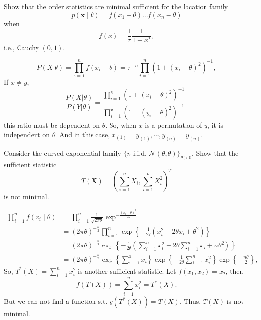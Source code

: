 \begin{exercise}
    Show that the order statistics are minimal sufficient for the location family
    \[
        p(\mathbf{x} \mid \theta)=f\left(x_{1}-\theta\right) \ldots f\left(x_{n}-\theta\right)
    \]
    when
    \[
        f(x)=\frac{1}{\pi} \frac{1}{1+x^{2}},
    \]
    i.e., Cauchy \((0,1)\). 
\end{exercise}

\begin{solution}
    \[
        P(X|\theta)=\prod_{i=1}^nf(x_i-\theta)=\pi^{-n}\prod_{i=1}^n(1+(x_i-\theta)^2)^{-1}, 
    \]
    If $x\neq y$, 
    \[
        \frac{P(X|\theta)}{P(Y|\theta)}=\frac{\prod_{i=1}^n(1+(x_i-\theta)^2)^{-1}}{\prod_{i=1}^n(1+(y_i-\theta)^2)^{-1}}, 
    \]
    this ratio must be dependent on $\theta$. So, when $x$ is a permutation of $y$, it is independent on $\theta$. And in this case, $x_{(1)}=y_{(1)}, \cdots, y_{(n)}=y_{(n)}$. 
\end{solution}

\begin{exercise}
    Consider the curved exponential family \(\{n \text { i.i.d. } \mathcal{N}(\theta, \theta)\}_{\theta>0}\). Show that the sufficient statistic
    \[
        T(\mathbf{X})=\left(\sum_{i=1}^{n} X_{i}, \sum_{i=1}^{n} X_{i}^{2}\right)^T
    \]
    is not minimal. 
\end{exercise}

\begin{solution}
    \[
        \begin{aligned} 
            \prod_{i=1}^{n} f\left(x_{i} \mid \theta\right) &=\prod_{i=1}^{n} \frac{1}{\sqrt{2 \pi \theta}} \exp^{-\frac{\left(x_{i}-\theta\right)^{2}}{2 \theta}} \\ &=(2 \pi \theta)^{-\frac{n}{2}} \prod_{i=1}^{n} \exp \left\{-\frac{1}{2 \theta}\left(x_{i}^{2}-2 \theta x_{i}+\theta^{2}\right)\right\} \\ &=(2 \pi \theta)^{-\frac{n}{2}} \exp \left\{-\frac{1}{2 \theta}\left(\sum_{i=1}^{n} x_{i}^{2}-2 \theta \sum_{i=1}^{n} x_{i}+n \theta^{2}\right)\right\} \\ &=(2 \pi \theta)^{-\frac{n}{2}} \exp \left\{\sum_{i=1}^{n} x_{i}\right\} \exp \left\{-\frac{1}{2 \theta} \sum_{i=1}^{n} x_{i}^{2}\right\} \exp \left\{-\frac{n \theta}{2}\right\}, 
        \end{aligned}
    \]
    So, $T^*(X)=\sum_{i=1}^nx_i^2$ is another sufficient statistic. Let $f(x_1,x_2)=x_2$, then 
    \[
        f(T(X))=\sum_{i=1}^nx_i^2 = T^*(X). 
    \]
    But we can not find a function s.t. $g(T^*(X))=T(X)$. Thus, $T(X)$ is not minimal. 
\end{solution}

